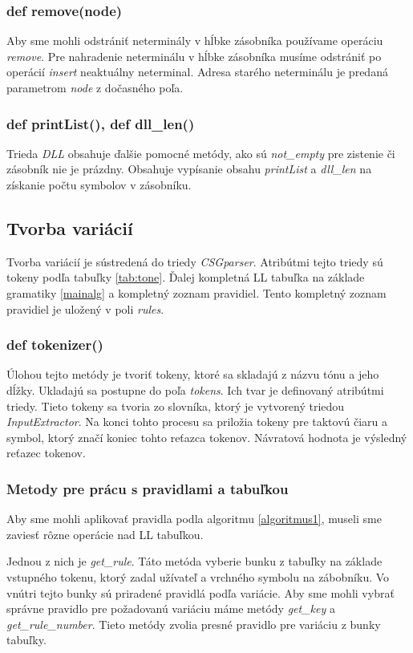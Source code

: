 \subsubsection*{def remove(node)}
Aby sme mohli odstrániť neterminály v hĺbke zásobníka používame operáciu \textit{remove}. Pre nahradenie neterminálu v hĺbke zásobníka musíme odstrániť po operácií \textit{insert} neaktuálny neterminal. Adresa starého neterminálu je predaná parametrom \textit{node} z dočasného poľa.

\subsubsection*{def printList(), def dll\_len()}
Trieda \textit{DLL} obsahuje ďalšie pomocné metódy, ako sú \textit{not\_empty} pre zistenie či zásobník nie je prázdny. Obsahuje vypísanie obsahu \textit{printList} a \textit{dll\_len} na získanie počtu symbolov v zásobníku.

\subsection{Tvorba variácií}
Tvorba variácií je sústredená do triedy \textit{CSGparser}. Atribútmi tejto triedy sú tokeny podľa tabuľky \ref{tab:tone}. Ďalej kompletná LL tabuľka na základe gramatiky \ref{mainalg} a kompletný zoznam pravidiel. Tento kompletný zoznam pravidiel je uložený v poli \textit{rules}.

\subsubsection*{def tokenizer()}
Úlohou tejto metódy je tvoriť tokeny, ktoré sa skladajú z názvu tónu a jeho dĺžky. Ukladajú sa postupne do poľa \textit{tokens}. Ich tvar je definovaný atribútmi triedy. Tieto tokeny sa tvoria zo slovníka, ktorý je vytvorený triedou \textit{InputExtractor}. Na konci tohto procesu sa priložia tokeny pre taktovú čiaru a symbol, ktorý značí koniec tohto reťazca tokenov. Návratová hodnota je výsledný reťazec tokenov.

\subsubsection*{Metody pre prácu s pravidlami a tabuľkou}
Aby sme mohli aplikovať pravidla podla algoritmu \ref{algoritmus1}, museli sme zaviesť rôzne operácie nad LL tabuľkou.

Jednou z nich je \textit{get\_rule}. Táto metóda vyberie bunku z tabuľky na základe vstupného tokenu, ktorý zadal užívateľ a vrchného symbolu na zábobníku. Vo vnútri tejto bunky sú priradené pravidlá podľa variácie. Aby sme mohli vybrať správne pravidlo pre požadovanú variáciu máme metódy \textit{get\_key} a \textit{get\_rule\_number}. Tieto metódy zvolia presné pravidlo pre variáciu z bunky tabuľky.

